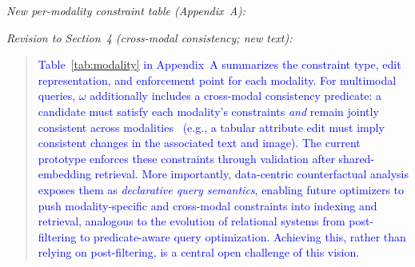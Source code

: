 \noindent\emph{New per-modality constraint table (Appendix~A):}
\begin{table}[h]
\centering\small
\caption{Modality-specific counterfactual semantics: constraint type, edit representation, and where each constraint is enforced.}
\label{tab:modality}
\end{table}

\noindent\emph{Revision to Section~4 (cross-modal consistency; new text):}
\begin{quote}
\textcolor{blue}{Table~\ref{tab:modality} in Appendix~A summarizes the constraint type, edit representation, and enforcement point for each modality. For multimodal queries, $\omega$ additionally includes a cross-modal consistency predicate: a candidate must satisfy each modality's constraints \emph{and} remain jointly consistent across modalities~\cite{chen2019cross} (e.g., a tabular attribute edit must imply consistent changes in the associated text and image). The current prototype enforces these constraints through validation after shared-embedding retrieval. More importantly, data-centric counterfactual analysis exposes them as \emph{declarative query semantics}, enabling future optimizers to push modality-specific and cross-modal constraints into indexing and retrieval, analogous to the evolution of relational systems from post-filtering to predicate-aware query optimization. Achieving this, rather than relying on post-filtering, is a central open challenge of this vision.}
\end{quote}
